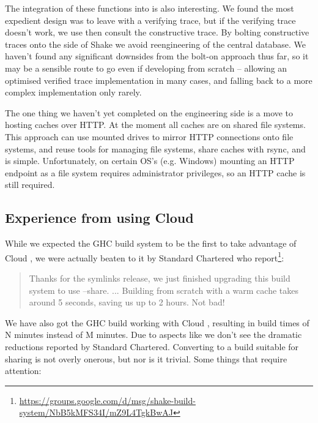 The integration of these functions into \Shake is also interesting. We found the most expedient design was to leave \Shake with a verifying trace, but if the verifying trace doesn't work, we use then consult the constructive trace. By bolting constructive traces onto the side of Shake we avoid reengineering of the central database. We haven't found any significant downsides from the bolt-on approach thus far, so it may be a sensible route to go even if developing from scratch -- allowing an optimised verified trace implementation in many cases, and falling back to a more complex implementation only rarely.

The one thing we haven't yet completed on the engineering side is a move to hosting caches over HTTP. At the moment all caches are on shared file systems. This approach can use mounted drives to mirror HTTP connections onto file systems, and reuse tools for managing file systems, share caches with rsync, and is simple. Unfortunately, on certain OS's (e.g. Windows) mounting an HTTP endpoint as a file system requires administrator privileges, so an HTTP cache is still required.

\subsection{Experience from using Cloud \Shake}

While we expected the GHC build system to be the first to take advantage of Cloud \Shake, we were actually beaten to it by Standard Chartered who report\footnote{\url{https://groups.google.com/d/msg/shake-build-system/NbB5kMFS34I/mZ9L4TgkBwAJ}}:

\begin{quote}
Thanks for the symlinks release, we just finished upgrading this build system to use --share. ...
Building from scratch with a warm cache takes around 5 seconds, saving us up to 2 hours. Not bad!
\end{quote}

We have also got the GHC build working with Cloud \Shake, resulting in build times of N minutes instead of M minutes. Due to aspects like  we don't see the dramatic reductions reported by Standard Chartered. Converting to a build suitable for sharing is not overly onerous, but nor is it trivial. Some things that require attention:

